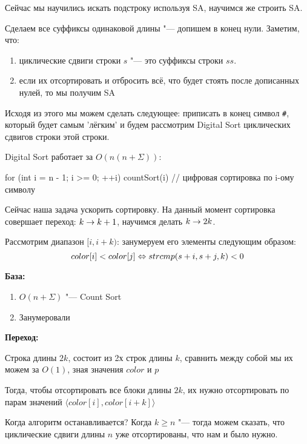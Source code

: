 Сейчас мы научились искать подстроку используя SA, научимся же строить SA.

Сделаем все суффиксы одинаковой длины "--- допишем в конец нули. Заметим, что:
\begin{enumerate}
	\item циклические сдвиги строки $s$ "--- это суффиксы строки $ss$.
	\item если их отсортировать и отбросить всё, что будет стоять после дописанных нулей, то мы получим SA
\end{enumerate}

Исходя из этого мы можем сделать следующее: приписать в конец символ \texttt{\#}, который будет самым 'лёгким'  и 
будем рассмотрим Digital Sort циклических сдвигов строки этой строки. 

Digital Sort работает за $O(n(n + \Sigma))$:
\begin{cppcode}
	for (int i = n - 1; i >= 0; ++i)
		countSort(i) // цифровая сортировка по i-ому символу
\end{cppcode}
	
Сейчас наша задача ускорить сортировку. На данный момент сортировка совершает переход: $k \rightarrow k + 1$,  научимся делать $k \rightarrow 2k$.
	
Рассмотрим диапазон $[i, i + k)$: занумеруем его элементы следующим образом:
\[ color[i] < color[j] \Leftrightarrow strcmp(s + i, s + j,  k) < 0 \]
	
\textbf{База:}

\begin{enumerate}
	\item $O(n + \Sigma)$ "--- Count Sort
	\item Занумеровали
\end{enumerate}
	
\textbf{Переход:}

	Строка длины 	$2k$, состоит из 2х строк длины $k$, сравнить между собой мы их можем за $O(1)$, зная значения $color$ и $p$
	
	
	
	Тогда, чтобы отсортировать все блоки длины $2k$, их нужно отсортировать по парам значений $\langle color[i], color[i + k] \rangle$
	
	Когда алгоритм останавливается? Когда $k \geq n$ "--- тогда можем сказать, что циклические сдвиги длины $n$ уже отсортированы, что нам и было нужно.

